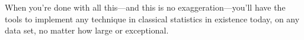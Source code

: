 \documentclass[12pt,notitlepage, openany]{book}
\begin{document}
When you're done with all this---and this is no exaggeration---you'll
have the tools to implement any technique in classical statistics in
existence today, on any data set, no matter how large or exceptional.









%

\nocite{*}


\printindex
\end{document}
